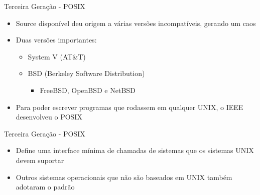 \documentclass{beamer}
\begin{document}
  \begin{frame}{Terceira Geração - POSIX}
      \begin{itemize}
          \item Source disponível deu origem a várias versões incompatíveis, gerando um caos
          \item Duas versões importantes:
                \begin{itemize}
                    \item System V (AT\&T)
                    \item BSD (Berkeley Software Distribution)
                          \begin{itemize}
                              \item FreeBSD, OpenBSD e NetBSD
                          \end{itemize}
                \end{itemize}
          \item Para poder escrever programas que rodassem em qualquer UNIX, o IEEE desenvolveu o POSIX
      \end{itemize}
  \end{frame}
  
  \begin{frame}{Terceira Geração - POSIX}
      \begin{itemize}
          \item Define uma interface mínima de chamadas de sistemas que os sistemas UNIX devem suportar
          \item Outros sistemas operacionais que não são baseados em UNIX também adotaram o padrão
      \end{itemize}
  \end{frame}
  
  
\end{document}
